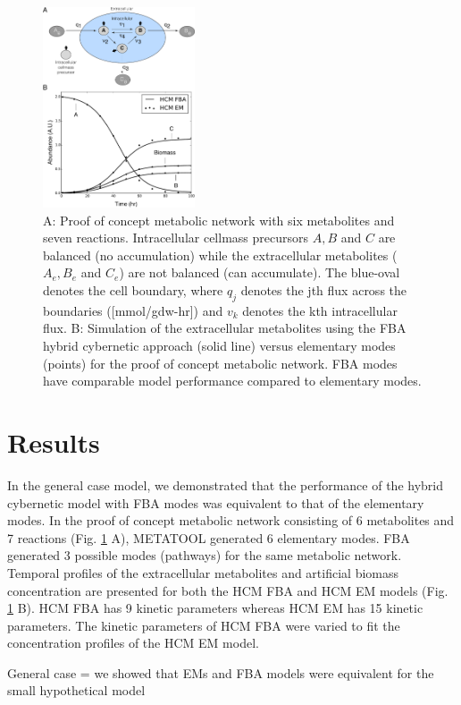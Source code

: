 \documentclass[10pt,twocolumn,twoside,final]{IEEEtran}
\begin{document}
\begin{figure}[!t]\centering
\includegraphics[width=0.40\textwidth]{./figs/Fig-1-GeneralModel-Results.pdf}
\caption{A: Proof of concept metabolic network with six metabolites and seven reactions.
Intracellular cellmass precursors $A,B$ and $C$ are balanced (no accumulation) while the extracellular metabolites ($A_{e},B_{e}$ and $C_{e}$) are not balanced (can accumulate). The blue-oval denotes the cell boundary, where $q_{j}$ denotes the jth flux across the boundaries ([mmol/gdw-hr]) and $v_{k}$ denotes the kth intracellular flux. B: Simulation of the extracellular metabolites using the FBA hybrid cybernetic approach (solid line) versus elementary modes (points) for the proof of concept metabolic network. FBA modes have comparable model performance compared to elementary modes.
}\label{fig:model-fitting}
\end{figure}

\section{Results}
In the general case model, we demonstrated that the performance of the hybrid cybernetic model with FBA modes was equivalent to that of the elementary modes. In the proof of concept metabolic network consisting of 6 metabolites and 7 reactions (Fig. \ref{fig:model-fitting} A), METATOOL generated 6 elementary modes. FBA generated 3 possible modes (pathways) for the same metabolic network. Temporal profiles of the extracellular metabolites and artificial biomass concentration are presented for both the HCM FBA and HCM EM models (Fig. \ref {fig:model-fitting} B).  HCM FBA has 9 kinetic parameters whereas HCM EM has 15 kinetic parameters. The kinetic parameters of HCM FBA were varied to fit the concentration profiles of the HCM EM model. 

General case = we showed that EMs and FBA models were equivalent for the small hypothetical model
\end{document}
